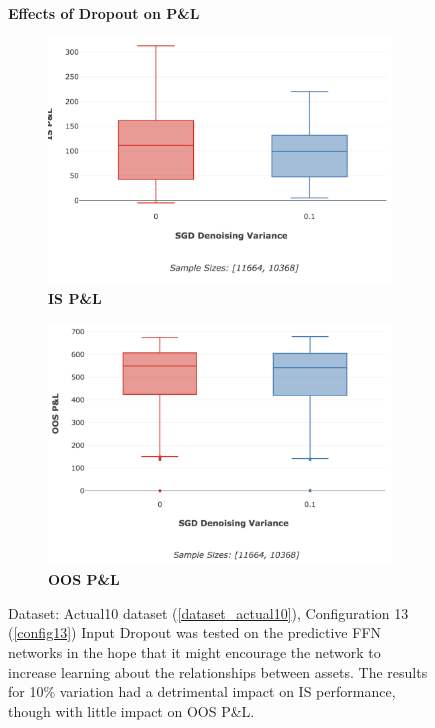 \documentclass[a4paper,11pt,oneside]{article}
\theoremstyle{plain}
\theoremstyle{definition}
\begin{document}
	\begin{figure}[H]
		\centering
		\textbf{Effects of Dropout on P\&L}
				\begin{subfigure}{.5\textwidth}
			\centering 
			\includegraphics[scale=0.3]{images/results/complexity/is_actual_pl_masking.png}
			\caption{\textbf{IS P\&L} }
			\label{figure-is_actual_pl_masking}
		\end{subfigure}%
		\begin{subfigure}{.5\textwidth}
			\centering 
			\includegraphics[scale=0.3]{images/results/complexity/oos_actual_pl_masking.png}
			\caption{\textbf{OOS P\&L} }
			\label{figure-oos_actual_pl_masking}
		\end{subfigure}
		\caption[Effects of Dropout on P\&L]{Dataset: Actual10 dataset (\ref{dataset_actual10}), Configuration 13 (\ref{config13})
			\newline Input Dropout was tested on the predictive FFN networks in the hope that it might encourage the network to increase learning about the relationships between assets. The results for 10\% variation had a detrimental impact on IS performance, though with little impact on OOS P\&L.}
		\label{figure-actual_pl_masking}
	\end{figure}
		
\end{document}
